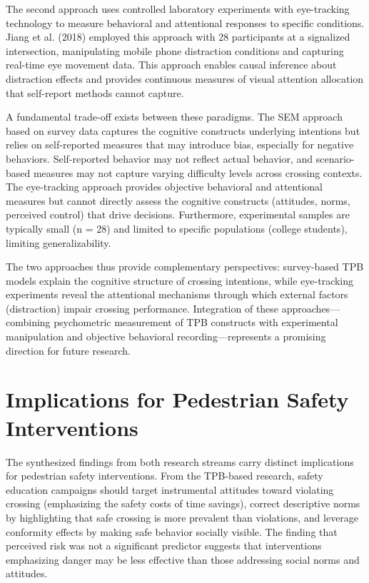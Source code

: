 \documentclass{article}
\begin{document}
The second approach uses controlled laboratory experiments with eye-tracking technology to measure behavioral and attentional responses to specific conditions. Jiang et al. (2018) employed this approach with 28 participants at a signalized intersection, manipulating mobile phone distraction conditions and capturing real-time eye movement data. This approach enables causal inference about distraction effects and provides continuous measures of visual attention allocation that self-report methods cannot capture. \cite{09_2018_jiang_aap}

A fundamental trade-off exists between these paradigms. The SEM approach based on survey data captures the cognitive constructs underlying intentions but relies on self-reported measures that may introduce bias, especially for negative behaviors. Self-reported behavior may not reflect actual behavior, and scenario-based measures may not capture varying difficulty levels across crossing contexts. The eye-tracking approach provides objective behavioral and attentional measures but cannot directly assess the cognitive constructs (attitudes, norms, perceived control) that drive decisions. Furthermore, experimental samples are typically small (n = 28) and limited to specific populations (college students), limiting generalizability. \cite{08_2016_zhou_aap}

The two approaches thus provide complementary perspectives: survey-based TPB models explain the cognitive structure of crossing intentions, while eye-tracking experiments reveal the attentional mechanisms through which external factors (distraction) impair crossing performance. Integration of these approaches—combining psychometric measurement of TPB constructs with experimental manipulation and objective behavioral recording—represents a promising direction for future research. \cite{09_2018_jiang_aap}

\section{Implications for Pedestrian Safety Interventions}
The synthesized findings from both research streams carry distinct implications for pedestrian safety interventions. From the TPB-based research, safety education campaigns should target instrumental attitudes toward violating crossing (emphasizing the safety costs of time savings), correct descriptive norms by highlighting that safe crossing is more prevalent than violations, and leverage conformity effects by making safe behavior socially visible. The finding that perceived risk was not a significant predictor suggests that interventions emphasizing danger may be less effective than those addressing social norms and attitudes. \cite{08_2016_zhou_aap}
\end{document}
